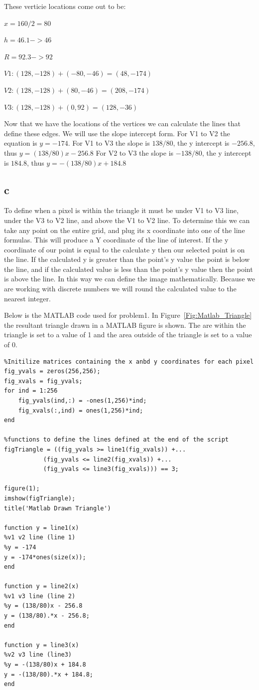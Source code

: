 \documentclass[12pt]{article}
\begin{document}
These verticie locations come out to be:

$x = 160/2 = 80$

$h = 46.1 -> 46$

$R = 92.3 -> 92$

$V1: (128,-128) + (-80,-46) = (48,-174)$

$V2: (128,-128) + (80,-46) = (208,-174)$

$V3 : (128,-128) + (0,92) = (128,-36)$

Now that we have the locations of the vertices we can calculate the lines that define these edges. We will use the slope intercept form.
For V1 to V2 the equation is $y = -174$.
For V1 to V3 the slope is $138/80$, the y intercept is $-256.8$, thus $y = (138/80)x - 256.8$
For V2 to V3 the slope is $-138/80$, the y intercept is $184.8$, thus $y = -(138/80)x + 184.8$
\subsection{c}
To define when a pixel is within the triangle it must be under V1 to V3 line, under the V3 to V2 line, and above the V1 to V2 line. To determine this we can take any point on the entire grid, and plug its x coordinate into one of the line formulas. This will produce a Y coordinate of the line of interest. If the y coordinate of our point is equal to the calculate y then our selected point is on the line. If the calculated y is greater than the point's y value the point is below the line, and if the calculated value is less than the point's y value then the point is above the line. In this way we can define the image mathematically. Because we are working with discrete numbers we will round the calculated value to the nearest integer.

Below is the MATLAB code used for problem1. In Figure~\ref{Fig:Matlab_Triangle} the resultant triangle drawn in a MATLAB figure is shown. The are within the triangle is set to a value of 1 and the area outside of the triangle is set to a value of 0.
\begin{lstlisting}[style=Matlab-editor]
%Problem 1
%Initilize matrices containing the x anbd y coordinates for each pixel
fig_yvals = zeros(256,256);
fig_xvals = fig_yvals;
for ind = 1:256
	fig_yvals(ind,:) = -ones(1,256)*ind;
	fig_xvals(:,ind) = ones(1,256)*ind;
end

%functions to define the lines defined at the end of the script
figTriangle = ((fig_yvals >= line1(fig_xvals)) +...
	       (fig_yvals <= line2(fig_xvals)) +...
	       (fig_yvals <= line3(fig_xvals))) == 3;

figure(1);
imshow(figTriangle);
title('Matlab Drawn Triangle')

function y = line1(x)
%v1 v2 line (line 1)
%y = -174
y = -174*ones(size(x));
end

function y = line2(x)
%v1 v3 line (line 2)
%y = (138/80)x - 256.8
y = (138/80).*x - 256.8;
end

function y = line3(x)
%v2 v3 line (line3)
%y = -(138/80)x + 184.8
y = -(138/80).*x + 184.8;
end
\end{lstlisting}
\end{document}
